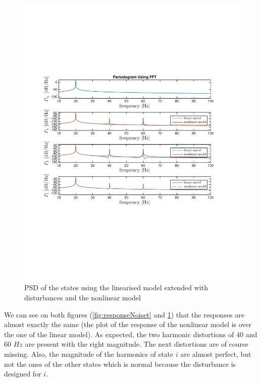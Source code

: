 \begin{figure}[H]
 \centering 
 \includegraphics[trim=2cm 7cm 2cm 7cm, clip=true, totalheight=0.35\textheight, angle=0]{figures/p11freq.pdf}
 \caption{PSD of the states using the linearised model extended with disturbances and the nonlinear model}
 \label{fig:responseNoisef}
\end{figure}

We can see on both figures (\ref{fig:responseNoiset} and \ref{fig:responseNoisef}) that the responses are almost exactly the same (the plot of the response of the nonlinear model is over the one of the linear model). As expected, the two harmonic distortions of $40$ and $60$ $Hz$ are present with the right magnitude. The next distortions are of course missing. Also, the magnitude of the harmonics of state $i$ are almost perfect, but not the ones of the other states which is normal because the disturbance is designed for $i$.

